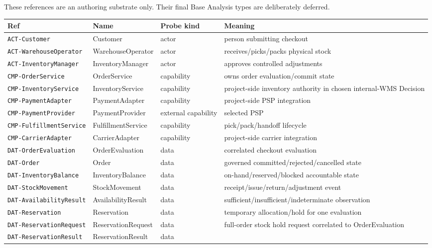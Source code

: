 \documentclass[
  10pt,
]{article}
\begin{document}
These references are an authoring substrate only. Their final Base
Analysis types are deliberately deferred.

\begin{longtable}[]{@{}llll@{}}
\toprule\noalign{}
Ref & Name & Probe kind & Meaning \\
\midrule\noalign{}
\endhead
\bottomrule\noalign{}
\endlastfoot
\texttt{ACT-Customer} & Customer & actor & person submitting checkout \\
\texttt{ACT-WarehouseOperator} & WarehouseOperator & actor &
receives/picks/packs physical stock \\
\texttt{ACT-InventoryManager} & InventoryManager & actor & approves
controlled adjustments \\
\texttt{CMP-OrderService} & OrderService & capability & owns order
evaluation/commit state \\
\texttt{CMP-InventoryService} & InventoryService & capability &
project-side inventory authority in chosen internal-WMS Decision \\
\texttt{CMP-PaymentAdapter} & PaymentAdapter & capability & project-side
PSP integration \\
\texttt{CMP-PaymentProvider} & PaymentProvider & external capability &
selected PSP \\
\texttt{CMP-FulfillmentService} & FulfillmentService & capability &
pick/pack/handoff lifecycle \\
\texttt{CMP-CarrierAdapter} & CarrierAdapter & capability & project-side
carrier integration \\
\texttt{DAT-OrderEvaluation} & OrderEvaluation & data & correlated
checkout evaluation \\
\texttt{DAT-Order} & Order & data & governed
committed/rejected/cancelled state \\
\texttt{DAT-InventoryBalance} & InventoryBalance & data &
on-hand/reserved/blocked accountable state \\
\texttt{DAT-StockMovement} & StockMovement & data &
receipt/issue/return/adjustment event \\
\texttt{DAT-AvailabilityResult} & AvailabilityResult & data &
sufficient/insufficient/indeterminate observation \\
\texttt{DAT-Reservation} & Reservation & data & temporary
allocation/hold for one evaluation \\
\texttt{DAT-ReservationRequest} & ReservationRequest & data & full-order
stock hold request correlated to OrderEvaluation \\
\texttt{DAT-ReservationResult} & ReservationResult & data &

\end{longtable}
\end{document}
